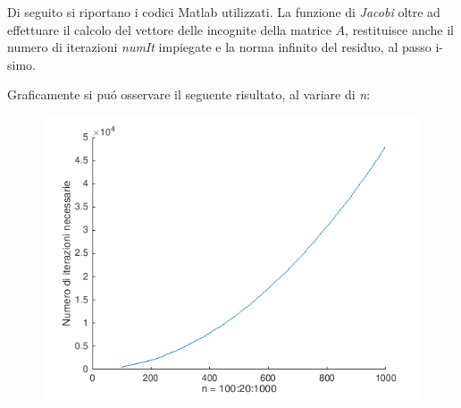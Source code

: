 \begin{center}
\large\noindent{}\end{center}

\noindent Di seguito si riportano i codici Matlab utilizzati. La funzione di \textit{Jacobi} oltre ad effettuare il calcolo del vettore delle incognite della matrice $A$, restituisce anche il numero di iterazioni \textit{numIt} impiegate e la norma infinito del residuo, al passo i-simo.


\vspace*{0.5cm}

\vspace*{1cm}
\noindent Graficamente si pu\'o osservare il seguente risultato, al variare di \textit{n}: 

\begin{figure}[H]
	\includegraphics[width=\textwidth]{Codici/Cap6/es3_cap6}
\end{figure}